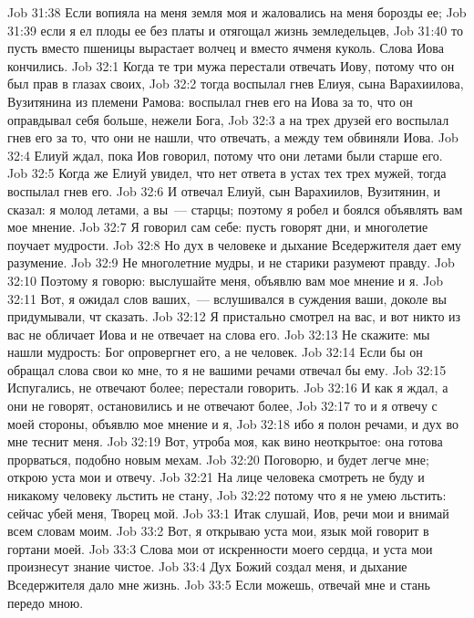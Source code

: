 \vs Job 31:38 Если вопияла на меня земля моя и жаловались на меня борозды ее;
\vs Job 31:39 если я ел плоды ее без платы и отягощал жизнь земледельцев,
\vs Job 31:40 то пусть вместо пшеницы вырастает волчец и вместо ячменя куколь. Слова Иова кончились.
\vs Job 32:1 Когда те три мужа перестали отвечать Иову, потому что он был прав в глазах своих,
\vs Job 32:2 тогда воспылал гнев Елиуя, сына Варахиилова, Вузитянина из племени Рамова: воспылал гнев его на Иова за то, что он оправдывал себя больше, нежели Бога,
\vs Job 32:3 а на трех друзей его воспылал гнев его за то, что они не нашли, что отвечать, а между тем обвиняли Иова.
\vs Job 32:4 Елиуй ждал, пока Иов говорил, потому что они летами были старше его.
\vs Job 32:5 Когда же Елиуй увидел, что нет ответа в устах тех трех мужей, тогда воспылал гнев его.
\vs Job 32:6 И отвечал Елиуй, сын Варахиилов, Вузитянин, и сказал: я молод летами, а вы~--- старцы; поэтому я робел и боялся объявлять вам мое мнение.
\vs Job 32:7 Я говорил сам себе: пусть говорят дни, и многолетие поучает мудрости.
\vs Job 32:8 Но дух в человеке и дыхание Вседержителя дает ему разумение.
\vs Job 32:9 Не многолетние  мудры, и не старики разумеют правду.
\vs Job 32:10 Поэтому я говорю: выслушайте меня, объявлю вам мое мнение и я.
\vs Job 32:11 Вот, я ожидал слов ваших,~--- вслушивался в суждения ваши, доколе вы придумывали, чт сказать.
\vs Job 32:12 Я пристально смотрел на вас, и вот никто из вас не обличает Иова и не отвечает на слова его.
\vs Job 32:13 Не скажите: мы нашли мудрость: Бог опровергнет его, а не человек.
\vs Job 32:14 Если бы он обращал слова свои ко мне, то я не вашими речами отвечал бы ему.
\vs Job 32:15 Испугались, не отвечают более; перестали говорить.
\vs Job 32:16 И как я ждал, а они не говорят, остановились и не отвечают более,
\vs Job 32:17 то и я отвечу с моей стороны, объявлю мое мнение и я,
\vs Job 32:18 ибо я полон речами, и дух во мне теснит меня.
\vs Job 32:19 Вот, утроба моя, как вино неоткрытое: она готова прорваться, подобно новым мехам.
\vs Job 32:20 Поговорю, и будет легче мне; открою уста мои и отвечу.
\vs Job 32:21 На лице человека смотреть не буду и никакому человеку льстить не стану,
\vs Job 32:22 потому что я не умею льстить: сейчас убей меня, Творец мой.
\vs Job 33:1 Итак слушай, Иов, речи мои и внимай всем словам моим.
\vs Job 33:2 Вот, я открываю уста мои, язык мой говорит в гортани моей.
\vs Job 33:3 Слова мои от искренности моего сердца, и уста мои произнесут знание чистое.
\vs Job 33:4 Дух Божий создал меня, и дыхание Вседержителя дало мне жизнь.
\vs Job 33:5 Если можешь, отвечай мне и стань передо мною.
